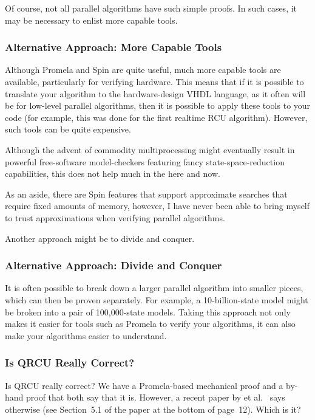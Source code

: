Of course, not all parallel algorithms have such simple proofs.
In such cases, it may be necessary to enlist more capable tools.

\subsubsection{Alternative Approach:
				     More Capable Tools}
\label{sec:formal:Alternative Approach: More Capable Tools}

Although Promela and Spin are quite useful,
much more capable tools are available, particularly for verifying
hardware.
This means that if it is possible to translate your algorithm
to the hardware-design VHDL language, as it often will be for
low-level parallel algorithms, then it is possible to apply these
tools to your code (for example, this was done for the first
realtime RCU algorithm).
However, such tools can be quite expensive.

Although the advent of commodity multiprocessing
might eventually result in powerful free-software model-checkers
featuring fancy state-space-reduction capabilities,
this does not help much in the here and now.

As an aside, there are Spin features that support approximate searches
that require fixed amounts of memory, however, I have never been able
to bring myself to trust approximations when verifying parallel
algorithms.

Another approach might be to divide and conquer.

\subsubsection{Alternative Approach:
				     Divide and Conquer}
\label{sec:formal:Alternative Approach: Divide and Conquer}

It is often possible to break down a larger parallel algorithm into
smaller pieces, which can then be proven separately.
For example, a 10-billion-state model might be broken into a pair
of 100,000-state models.
Taking this approach not only makes it easier for tools such as
Promela to verify your algorithms, it can also make your algorithms
easier to understand.

\subsubsection{Is QRCU Really Correct?}
\label{sec:formal:Is QRCU Really Correct?}

Is QRCU really correct?
We have a Promela-based mechanical proof and a by-hand proof that both
say that it is.
However, a recent paper by  et al.~\cite{JadeAlglave2013-cav}
says otherwise (see Section~5.1 of the paper at the bottom of page~12).
Which is it?


